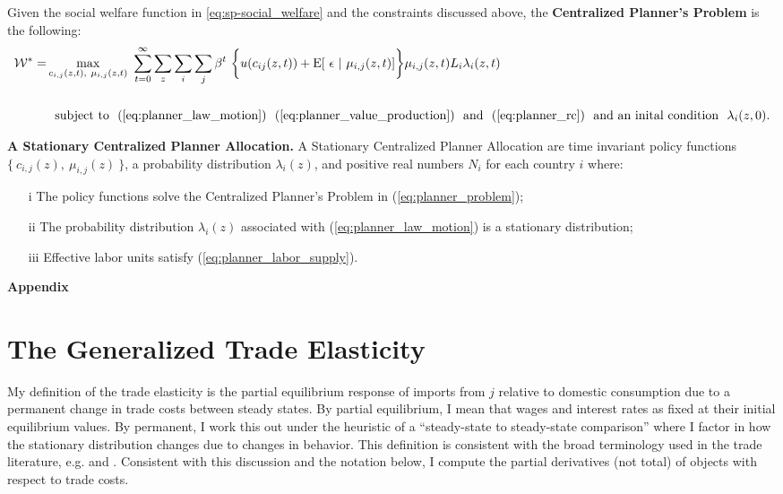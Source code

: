 \documentclass[12pt,pdftex]{article}
\begin{document}
\begin{onehalfspacing}
Given the social welfare function in \ref{eq:sp-social_welfare} and the constraints discussed above, the \textbf{Centralized Planner's Problem} is the following:
{\small
\begin{align}
\mathcal{W}^{*} = & \max\limits_{c_{i,j}(z, t),\ \mu_{i,j}(z, t)} \ \sum_{t=0}^{\infty}  \sum\limits_{z} \sum_{i} \sum_{j} \beta^{t} \  \bigg \{  u(c_{ij}(z, t) ) + \mathrm{E}[ \ \epsilon \ | \ \mu_{i,j}(z,t) ] \bigg \}\mu_{i,j}(z,t) L_{i} \lambda_{i}(z, t) \ \ \nonumber \\
\nonumber \\
& \ \ \mbox{subject to} \ \ (\ref{eq:planner_law_motion}) \ \ (\ref{eq:planner_value_production}) \ \ \mbox{and} \ \ (\ref{eq:planner_rc}) \ \ \mbox{and an inital condition} \ \ \lambda_i(z, 0).
\label{eq:planner_problem}
\end{align}
}

\textbf{A Stationary Centralized Planner Allocation.}  A Stationary Centralized Planner Allocation are time invariant policy functions $\{\ c_{i,j}(z),\ \mu_{i,j}(z) \ \}$, a probability distribution $\lambda_{i}(z)$, and positive real numbers $N_{i}$ for each country $i$ where:
\begin{itemize}
\item[i] The policy functions solve the Centralized Planner's Problem in (\ref{eq:planner_problem});
\item[ii] The probability distribution $\lambda_{i}(z)$ associated with (\ref{eq:planner_law_motion}) is a stationary distribution;
\item[iii] Effective labor units satisfy (\ref{eq:planner_labor_supply}).
\end{itemize}


\newpage




\appendix

\clearpage
\newpage

\begin{center}
\textbf{\Large Appendix}
\end{center}





\section{The Generalized Trade Elasticity}

My definition of the trade elasticity is the partial equilibrium response of imports from $j$ relative to domestic consumption due to a permanent change in trade costs between steady states. By partial equilibrium, I mean that wages and interest rates as fixed at their initial equilibrium values. By permanent, I work this out under the heuristic of a ``steady-state to steady-state comparison'' where I factor in how the stationary distribution changes due to changes in behavior. This definition is consistent with the broad terminology used in the trade literature, e.g. \citet{arkolakis2012new} and \citet{simonovska2014elasticity}. Consistent with this discussion and the notation below, I compute the partial derivatives (not total) of objects with respect to trade costs.


\end{onehalfspacing}
\end{document}
